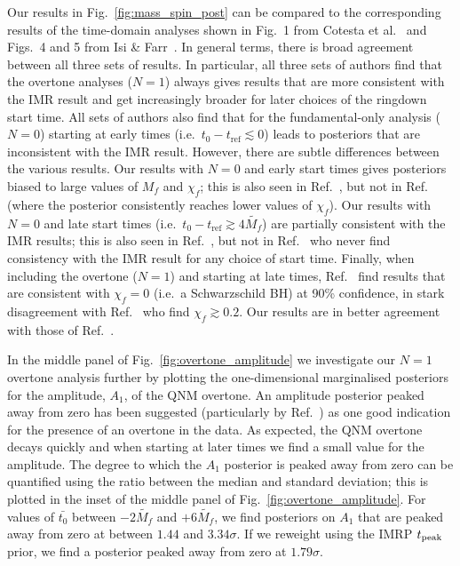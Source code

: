 Our results in Fig.~\ref{fig:mass_spin_post} can be compared to the corresponding results of the time-domain analyses shown in Fig.~1 from Cotesta et al.~\cite{Cotesta:2022pci} and Figs.~4 and 5 from Isi \& Farr~\cite{Isi:2022mhy}.
In general terms, there is broad agreement between all three sets of results. 
In particular, all three sets of authors find that the overtone analyses ($N=1$) always gives results that are more consistent with the IMR result and get increasingly broader for later choices of the ringdown start time.
All sets of authors also find that for the fundamental-only analysis ($N=0$) starting at early times (i.e.\ $t_0  - t_\mathrm{ref}\lesssim 0$) leads to posteriors that are inconsistent with the IMR result.
However, there are subtle differences between the various results.
Our results with $N=0$ and early start times gives posteriors biased to large values of $M_f$ and $\chi_f$; this is also seen in Ref.~\cite{Isi:2022mhy}, but not in Ref.~\cite{Cotesta:2022pci} (where the posterior consistently reaches lower values of $\chi_f$).
Our results with $N=0$ and late start times (i.e.\ $t_0 - t_\mathrm{ref}\gtrsim 4\tilde{M_f}$) are partially consistent with the IMR results; this is also seen in Ref.~\cite{Cotesta:2022pci}, but not in Ref.~\cite{Isi:2022mhy} who never find consistency with the IMR result for any choice of start time.
Finally, when including the overtone ($N=1$) and starting at late times, Ref.~\cite{Cotesta:2022pci} find results that are consistent with $\chi_f=0$ (i.e.\ a Schwarzschild BH) at 90\% confidence, in stark disagreement with Ref.~\cite{Isi:2022mhy} who find $\chi_f\gtrsim 0.2$. 
Our results are in better agreement with those of Ref.~\cite{Isi:2022mhy}.

In the middle panel of Fig.~\ref{fig:overtone_amplitude} we investigate our $N=1$ overtone analysis further by plotting the one-dimensional marginalised posteriors for the amplitude, $A_1$, of the QNM overtone.
An amplitude posterior peaked away from zero has been suggested (particularly by Ref.~\cite{Isi:2019aib}) as one good indication for the presence of an overtone in the data.
As expected, the QNM overtone decays quickly and when starting at later times we find a small value for the amplitude.
The degree to which the $A_1$ posterior is peaked away from zero can be quantified using the ratio between the median and standard deviation; this is plotted in the inset of the middle panel of Fig.~\ref{fig:overtone_amplitude}.
For values of $\bar{t_0}$ between $-2\tilde{M_f}$ and $+6\tilde{M_f}$, we find posteriors on $A_1$ that are peaked away from zero at between $1.44$ and $3.34\sigma$.
If we reweight using the IMRP $t_{\rm peak}$ prior, we find a posterior peaked away from zero at $1.79\sigma$.

